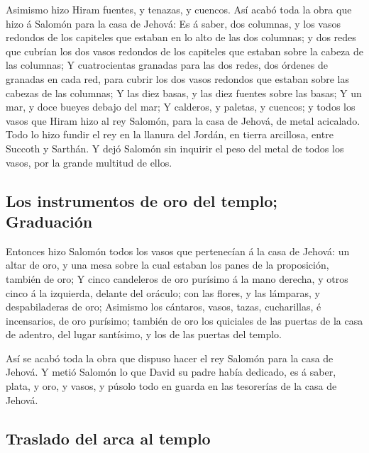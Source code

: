  Asimismo hizo Hiram fuentes, y tenazas, y cuencos. Así
acabó toda la obra que hizo á Salomón para la casa de Jehová:
 Es á saber, dos columnas, y los vasos redondos de los
capiteles que estaban en lo alto de las dos columnas; y dos redes que
cubrían los dos vasos redondos de los capiteles que estaban sobre la
cabeza de las columnas;  Y cuatrocientas granadas para
las dos redes, dos órdenes de granadas en cada red, para cubrir los dos
vasos redondos que estaban sobre las cabezas de las columnas;
 Y las diez basas, y las diez fuentes sobre las basas;
 Y un mar, y doce bueyes debajo del mar; 
Y calderos, y paletas, y cuencos; y todos los vasos que Hiram hizo al
rey Salomón, para la casa de Jehová, de metal acicalado. 
Todo lo hizo fundir el rey en la llanura del Jordán, en tierra
arcillosa, entre Succoth y Sarthán.  Y dejó Salomón sin
inquirir el peso del metal de todos los vasos, por la grande multitud de
ellos.

\hypertarget{los-instrumentos-de-oro-del-templo-graduaciuxf3n}{%
\subsection{Los instrumentos de oro del templo;
Graduación}\label{los-instrumentos-de-oro-del-templo-graduaciuxf3n}}

 Entonces hizo Salomón todos los vasos que pertenecían á
la casa de Jehová: un altar de oro, y una mesa sobre la cual estaban los
panes de la proposición, también de oro;  Y cinco
candeleros de oro purísimo á la mano derecha, y otros cinco á la
izquierda, delante del oráculo; con las flores, y las lámparas, y
despabiladeras de oro;  Asimismo los cántaros, vasos,
tazas, cucharillas, é incensarios, de oro purísimo; también de oro los
quiciales de las puertas de la casa de adentro, del lugar santísimo, y
los de las puertas del templo.

 Así se acabó toda la obra que dispuso hacer el rey
Salomón para la casa de Jehová. Y metió Salomón lo que David su padre
había dedicado, es á saber, plata, y oro, y vasos, y púsolo todo en
guarda en las tesorerías de la casa de Jehová.

\hypertarget{traslado-del-arca-al-templo}{%
\subsection{Traslado del arca al
templo}\label{traslado-del-arca-al-templo}}

